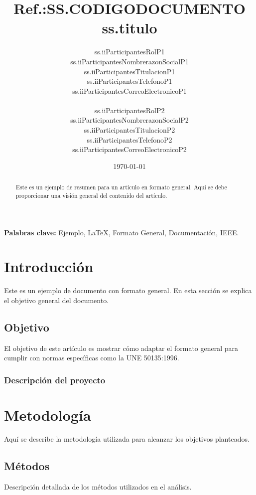 \documentclass[a4paper,10pt,twocolumn]{article}
\title{{\small Ref.:\uppercase{ss.codigoDocumento}}\\{\textbf{ss.titulo}}}
\author{
    \begin{minipage}{0.5\textwidth}
    \centering
    ss.iiParticipantesRolP1\\
    ss.iiParticipantesNombrerazonSocialP1 \\
    ss.iiParticipantesTitulacionP1\\
    ss.iiParticipantesTelefonoP1\\
    ss.iiParticipantesCorreoElectronicoP1\\
    \end{minipage}%
    \hfill
    \begin{minipage}{0.5\textwidth}
    \centering
    ss.iiParticipantesRolP2\\
    ss.iiParticipantesNombrerazonSocialP2 \\
    ss.iiParticipantesTitulacionP2\\
    ss.iiParticipantesTelefonoP2\\
    ss.iiParticipantesCorreoElectronicoP2\\    
    \end{minipage}%
}
\date{\today}
\begin{document}
\begin{Form}

	\maketitle

	\begin{abstract}
		Este es un ejemplo de resumen para un artículo en formato general. Aquí se debe proporcionar una visión general del contenido del artículo.
	\end{abstract}


	\noindent\textbf{Palabras clave:} Ejemplo, LaTeX, Formato General, Documentación, IEEE.

	\tableofcontents  %
	\listoffigures    %
	\listoftables     %

    \newpage


	\section{Introducción}
	Este es un ejemplo de documento con formato general. En esta sección se explica el objetivo general del documento.

	\subsection{Objetivo}
	El objetivo de este artículo es mostrar cómo adaptar el formato general para cumplir con normas específicas como la UNE 50135:1996.

	\subsubsection{Descripción del proyecto}
	\lipsum[1] %

	\section{Metodología}
	Aquí se describe la metodología utilizada para alcanzar los objetivos planteados.

	\subsection{Métodos}
	Descripción detallada de los métodos utilizados en el análisis.


\end{Form}
\end{document}
